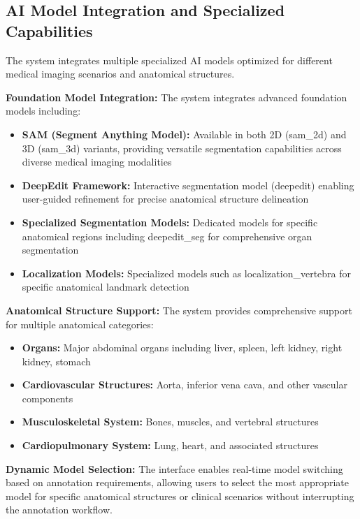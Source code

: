 \subsection{AI Model Integration and Specialized Capabilities}

The system integrates multiple specialized AI models optimized for different medical imaging scenarios and anatomical structures.

\textbf{Foundation Model Integration:} The system integrates advanced foundation models including:

\begin{itemize}
    \item \textbf{SAM (Segment Anything Model):} Available in both 2D (sam\_2d) and 3D (sam\_3d) variants, providing versatile segmentation capabilities across diverse medical imaging modalities
    \item \textbf{DeepEdit Framework:} Interactive segmentation model (deepedit) enabling user-guided refinement for precise anatomical structure delineation
    \item \textbf{Specialized Segmentation Models:} Dedicated models for specific anatomical regions including deepedit\_seg for comprehensive organ segmentation
    \item \textbf{Localization Models:} Specialized models such as localization\_vertebra for specific anatomical landmark detection
\end{itemize}

\textbf{Anatomical Structure Support:} The system provides comprehensive support for multiple anatomical categories:

\begin{itemize}
    \item \textbf{Organs:} Major abdominal organs including liver, spleen, left kidney, right kidney, stomach
    \item \textbf{Cardiovascular Structures:} Aorta, inferior vena cava, and other vascular components
    \item \textbf{Musculoskeletal System:} Bones, muscles, and vertebral structures
    \item \textbf{Cardiopulmonary System:} Lung, heart, and associated structures
\end{itemize}

\textbf{Dynamic Model Selection:} The interface enables real-time model switching based on annotation requirements, allowing users to select the most appropriate model for specific anatomical structures or clinical scenarios without interrupting the annotation workflow.

